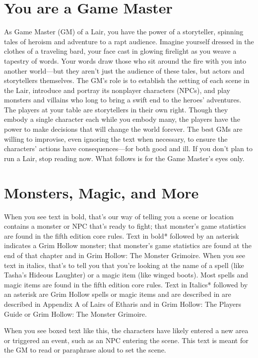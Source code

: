 \documentclass[10pt,a4paper,twoside,twocolumn,openany,bg=print,nodeprecatedcode]{dndbook}
\begin{document}
\section{You are a Game Master}
As Game Master (GM) of a Lair, you have the power of a storyteller, spinning tales of heroism and adventure to a rapt audience. Imagine yourself dressed in the clothes of a traveling bard, your face cast in glowing firelight as you weave a tapestry of words. Your words draw those who sit around the fire with you into another world—but they aren't just the audience of these tales, but actors and storytellers themselves.
The GM's role is to establish the setting of each scene in the Lair, introduce and portray its nonplayer characters (NPCs), and play monsters and villains who long to bring a swift end to the heroes' adventures. The players at your table are storytellers in their own right. Though they embody a single character each while you embody many, the players have the power to make decisions that will change the world forever. The best GMs are willing to improvise, even ignoring the text when necessary, to ensure the characters' actions have consequences—for both good and ill.
If you don't plan to run a Lair, stop reading now. What follows is for the Game Master's eyes only.
\section{Monsters, Magic, and More}
When you see text in bold, that's our way of telling you a scene or location contains a monster or NPC that's ready to fight; that monster's game statistics are found in the fifth edition core rules. Text in bold* followed by an asterisk indicates a Grim Hollow monster; that monster's game statistics are found at the end of that chapter and in Grim Hollow: The Monster Grimoire.
When you see text in italics, that's to tell you that you're looking at the name of a spell (like Tasha's Hideous Laughter) or a magic item (like winged boots). Most spells and magic items are found in the fifth edition core rules. Text in Italics* followed by an asterisk are Grim Hollow spells or magic items and are described in are described in Appendix A of Lairs of Etharis and in Grim Hollow: The Players Guide or Grim Hollow: The Monster Grimoire.
\begin{DndReadAloud}{}
When you see boxed text like this, the characters have likely entered a new area or triggered an event, such as an NPC entering the scene. This text is meant for the GM to read or paraphrase aloud to set the scene.
\end{DndReadAloud}
\end{document}

